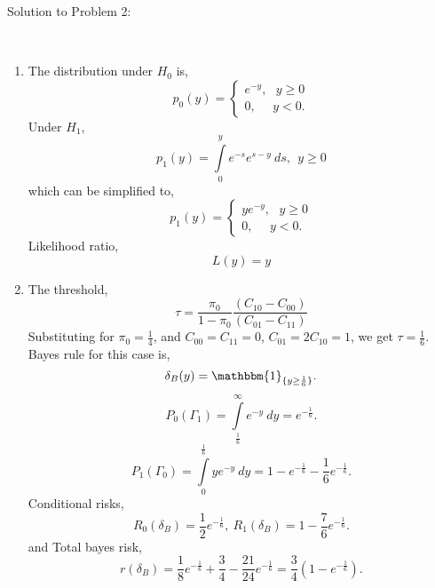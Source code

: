 \documentclass[a4paper,english,10pt]{article}
\begin{document}
\hypertarget{solution2}{ Solution to Problem 2:}\\
\begin{enumerate}[label=(\alph*).]
\item The distribution under $H_0$ is,
\begin{equation*}
	p_0(y)=\begin{cases}
		e^{-y},~~~y\geq 0\\	
		0,~~~~~~y<0.
	\end{cases}	
\end{equation*}
Under $H_1$, 
\begin{equation*}
p_1(y)=\int\limits_{0}^{y} e^{-s} e^{s-y}~ds,~~y\geq 0
\end{equation*}
which can be simplified to, 
\begin{equation*}
p_1(y)=\begin{cases}
		ye^{-y},~~~y\geq 0\\	
		0,~~~~~~y<0.
	\end{cases}	
\end{equation*}
Likelihood ratio,
\begin{equation*}
	L(y)=y
\end{equation*}
\item The threshold,
\begin{equation*}
	\tau=\frac{\pi_0 }{1-\pi_0} \frac{(C_{10}-C_{00})}{(C_{01}-C_{11})}
\end{equation*}
Substituting for $\pi_0=\frac{1}{4}$, and $C_{00}=C_{11}=0$, $C_{01}=2C_{10}=1$, we get $\tau=\frac{1}{6}$. Bayes rule for this case is,
\begin{equation*}
	\delta_B(y)=\mathbbm{1}_{\{y\geq \frac{1}{6}\}}.
\end{equation*}
\begin{equation*}
	P_0(\Gamma_1)=\int\limits_{\frac{1}{6}}^{\infty} e^{-y}~dy=e^{-\frac{1}{6}}.
\end{equation*}
\begin{equation*}
	P_1(\Gamma_0)=\int\limits_{0}^{\frac{1}{6}} ye^{-y}~dy=1-e^{-\frac{1}{6}}-\frac{1}{6}e^{-\frac{1}{6}}.
\end{equation*}
Conditional risks,
\begin{equation*}
R_0(\delta_B)=\frac{1}{2}e^{-\frac{1}{6}},~R_1(\delta_B)=1-\frac{7}{6}e^{-\frac{1}{6}}.
\end{equation*}
and Total bayes risk,
\begin{equation*}
	r(\delta_B)=\frac{1}{8}e^{-\frac{1}{6}}+\frac{3}{4}-\frac{21}{24}e^{-\frac{1}{6}}=\frac{3}{4}(1-e^{-\frac{1}{6}}).
\end{equation*}

\end{enumerate}
\end{document}
